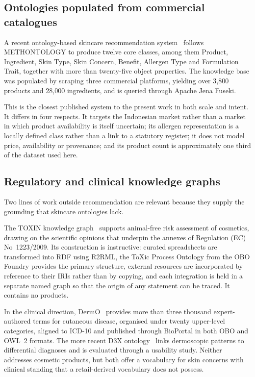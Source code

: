 \subsection{Ontologies populated from commercial catalogues}
\label{ssec:rw-bittech}

A recent ontology-based skincare recommendation system~\cite{bittech2025}
follows METHONTOLOGY to produce twelve core classes, among them Product,
Ingredient, Skin Type, Skin Concern, Benefit, Allergen Type and Formulation
Trait, together with more than twenty-five object properties. The knowledge
base was populated by scraping three commercial platforms, yielding over 3{,}800
products and 28{,}000 ingredients, and is queried through Apache Jena Fuseki.

This is the closest published system to the present work in both scale and
intent. It differs in four respects. It targets the Indonesian market rather
than a market in which product availability is itself uncertain; its allergen
representation is a locally defined class rather than a link to a statutory
register; it does not model price, availability or provenance; and its product
count is approximately one third of the dataset used here.


\subsection{Regulatory and clinical knowledge graphs}
\label{ssec:rw-regulatory}

Two lines of work outside recommendation are relevant because they supply the
grounding that skincare ontologies lack.

The TOXIN knowledge graph~\cite{toxin2024} supports animal-free risk assessment
of cosmetics, drawing on the scientific opinions that underpin the annexes of
Regulation (EC) No~1223/2009. Its construction is instructive: curated
spreadsheets are transformed into RDF using R2RML, the ToXic Process Ontology
from the OBO Foundry provides the primary structure, external resources are
incorporated by reference to their IRIs rather than by copying, and each
integration is held in a separate named graph so that the origin of any
statement can be traced. It contains no products.

In the clinical direction, DermO~\cite{dermo2016} provides more than three
thousand expert-authored terms for cutaneous disease, organised under twenty
upper-level categories, aligned to ICD-10 and published through BioPortal in
both OBO and OWL~2 formats. The more recent D3X ontology~\cite{d3x2024} links
dermoscopic patterns to differential diagnoses and is evaluated through a
usability study. Neither addresses cosmetic products, but both offer a
vocabulary for skin concerns with clinical standing that a retail-derived
vocabulary does not possess.

